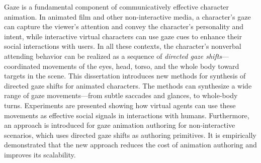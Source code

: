 Gaze is a fundamental component of communicatively effective character animation. In animated film and other non-interactive media, a character's gaze can capture the viewer's attention and convey the character's personality and intent, while interactive virtual characters can use gaze cues to enhance their social interactions with users. In all these contexts, the character's nonverbal attending behavior can be realized as a sequence of \emph{directed gaze shifts}---coordinated movements of the eyes, head, torso, and the whole body toward targets in the scene.
This dissertation introduces new methods for synthesis of directed gaze shifts for animated characters. The methods can synthesize a wide range of gaze movements---from subtle saccades and glances, to whole-body turns. Experiments are presented showing how virtual agents can use these movements as effective social signals in interactions with humans.
Furthermore, an approach is introduced for gaze animation authoring for non-interactive scenarios, which uses directed gaze shifts as authoring primitives. It is empirically demonstrated that the new approach reduces the cost of animation authoring and improves its scalability.
